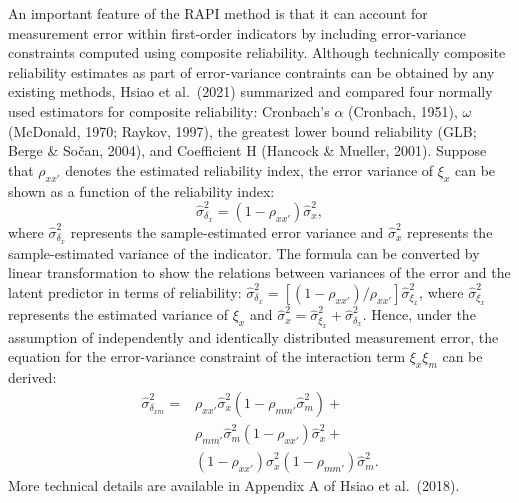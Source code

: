 \documentclass[
  man]{apa6}
\begin{document}
An important feature of the RAPI method is that it can account for measurement error within first-order indicators by including error-variance constraints computed using composite reliability. Although technically composite reliability estimates as part of error-variance contraints can be obtained by any existing methods, Hsiao et al.~(2021) summarized and compared four normally used estimators for composite reliability: Cronbach's \(\alpha\) (Cronbach, 1951), \(\omega\) (McDonald, 1970; Raykov, 1997), the greatest lower bound reliability (GLB; Berge \& Sočan, 2004), and Coefficient H (Hancock \& Mueller, 2001). Suppose that \(\rho_{xx'}\) denotes the estimated reliability index, the error variance of \(\xi_{x}\) can be shown as a function of the reliability index:
\begin{equation}
\hat{\sigma}^2_{\delta_{x}} = (1 - \rho_{xx'})\hat{\sigma}^2_{{x}},
\end{equation}
where \(\hat{\sigma}^2_{\delta_{x}}\) represents the sample-estimated error variance and \(\hat{\sigma}^2_{{x}}\) represents the sample-estimated variance of the indicator. The formula can be converted by linear transformation to show the relations between variances of the error and the latent predictor in terms of reliability: \(\hat{\sigma}_{\delta_{x}}^2 = [(1 - \rho_{xx'})/{\rho_{xx'}}]\hat{\sigma}^2_{\xi_{x}}\), where \(\hat{\sigma}^2_{\xi_{x}}\) represents the estimated variance of \(\xi_{x}\) and \(\hat{\sigma}^2_{{x}} = {\hat{\sigma}^2_{\xi_{x}} + \hat{\sigma}^2_{\delta_{x}}}\). Hence, under the assumption of independently and identically distributed measurement error, the equation for the error-variance constraint of the interaction term \(\xi_{x}\xi_{m}\) can be derived:
\begin{equation}
\begin{aligned}
\hat{\sigma}^2_{\delta_{xm}} = & \rho_{xx'}\hat{\sigma}^2_{{x}}(1 - \rho_{mm'}\hat{\sigma}^2_{{m}}) + \\&
                        \rho_{mm'}\hat{\sigma}^2_{{m}}(1-\rho_{xx'})\hat{\sigma}^2_{{x}} + \\&
                        (1 - \rho_{xx'})\hat{\sigma}^2_{{x}}(1 - \rho_{mm'})\hat{\sigma}^2_{{m}}. 
\end{aligned}
\end{equation}
More technical details are available in Appendix A of Hsiao et al.~(2018).
\end{document}

